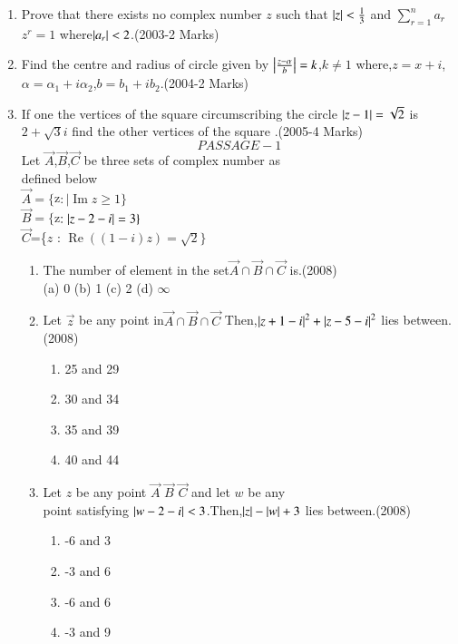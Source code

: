 \documentclass[journal]{IEEEtran}
\begin{document}
\begin{enumerate}[start=7]
\item Prove that there exists no complex number $z$ such that $\left\vert z\right\vert<\frac{1}{3}$ and $\sum_{r=1}^{n}$$a_r$$z^{r}=1$ where$\left\vert a_r\right\vert<2$.\hfill (2003-2 Marks)\\
\item Find the centre and radius  of circle given by $\left\vert\frac{z-\alpha} b\right\vert=k$,$k\not=1$ where,$z=x+i$,$\alpha=\alpha_1+i\alpha_2$,$b=b_{1}+ib_{2}$.\hfill(2004-2 Marks)\\ 
\item If one the vertices of the square circumscribing the circle $\left\vert z-1\right\vert=\sqrt{2}$ is $2+\sqrt{3}i$ find the other vertices of the square .\hfill (2005-4 Marks) \\
$$PASSAGE-1$$
Let $\vec{A}$,$\vec{B}$,$\vec{C}$ be three sets of complex number as\\ defined below\\$\vec{A} = \{ $z$ :\mid \operatorname{Im}z\geq1\}$\\$\vec{B}=\{$z$:\left\vert z-2-i\right\vert=3\}$\\$\vec{C}$=\{$z$ : $\operatorname{Re} \left((1-i)z\right) = \sqrt{2} \}$\\
\begin{enumerate}     
\item The number of element in the set$\vec{A} \cap\vec{B} \cap\vec{C} $ is.\hfill (2008)\\
   (a) 0 \hfill
   (b) 1 \hfill
   (c) 2 \hfill
   (d) $\infty$\\
\item Let $\vec{z}$ be any point in$ \vec{A}\cap\vec{B}\cap\vec{C} $ Then,$\left\vert z+1-i\right\vert^2+\left\vert z-5-i\right\vert^2$ lies between. \hfill  (2008) 
\begin{multicols}{2}
    \begin{enumerate}
        \item 25 and 29
        \item 30 and 34
        \item 35 and 39
        \item 40 and 44
    \end{enumerate}
\end{multicols}
\item  Let $z$ be any point $\vec{A}$ $\vec{B}$ $\vec{C}$ and let $w$ be any\\point satisfying $\left\vert w-2-i\right\vert<3$.Then,$\left\vert z\right\vert-\left\vert w\right\vert+3$ lies between.\hfill (2008) 
 \begin{multicols}{2}
  \begin{enumerate}
    \item -6 and 3
    \item -3 and 6 
    \item -6 and 6
    \item -3 and 9
  \end{enumerate}
 \end{multicols}
\end{enumerate}
\end{enumerate}
\end{document}
